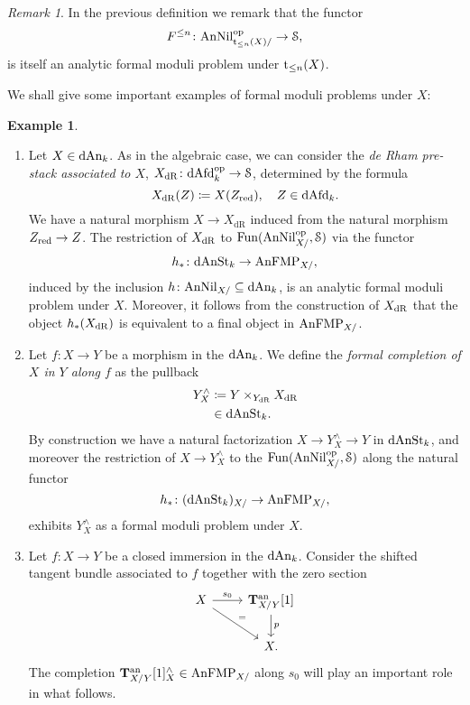 \documentclass[10pt,a4paper,reqno]{amsart} %
\theoremstyle{plain}
\theoremstyle{definition}
\newtheorem{eg}[thm]{Example}
\theoremstyle{remark}
\newtheorem{rem}[thm]{Remark}
\numberwithin{equation}{section}
\begin{document}
\begin{rem}
    In the previous definition we remark that the functor
        \[
            F^{\le n} \colon \mathrm{AnNil}^\mathrm{op}_{\mathrm t_{\le n}(X)/ } \to \mathcal S,  
        \]
    is itself an analytic formal moduli problem under $\mathrm t_{\le n}(X)$.
\end{rem}

We shall give some important examples of formal moduli problems under $X$:

\begin{eg}
    \begin{enumerate}
        \item Let $X \in \mathrm{dAn}_k$. As in the algebraic case, we can consider the \emph{de Rham pre-stack associated to $X$}, $X_\mathrm{dR} \colon \mathrm{dAfd}_k^\mathrm{op} \to \mathcal S$,
        determined by the formula
            \[
                X_{\mathrm{dR}}(Z) \coloneqq X(Z_{\mathrm{red}}), \quad Z \in \mathrm{dAfd}_k.  
            \]
        We have a natural morphism $X \to X_\mathrm{dR}$ induced from the natural morphism $Z_{\mathrm{red}} \to Z$.
        The restriction of $X_{\mathrm{dR}}$ to $\operatorname{Fun}(\mathrm{AnNil}^\mathrm{op}_{X/ }, \mathcal S)$ via the functor
            \[
                h_* \colon \mathrm{dAnSt}_k \to \mathrm{AnFMP}_{X/ },
            \]
        induced by the inclusion $h \colon \mathrm{AnNil}_{X/ } \subseteq \mathrm{dAn}_k$, is an analytic formal moduli problem under $X$.
        Moreover, it follows from the construction of $X_{\mathrm{dR}}$ that the object $h_* (X_{\mathrm{dR}})$ is equivalent to a final object in $\mathrm{AnFMP}_{X/ }$.
        \item Let $f \colon X \to Y$ be a morphism in the \infcat $\mathrm{dAn}_k$. We define the \emph{formal completion of $X$ in $Y$ along $f$} as the pullback 
            \begin{align*}
                Y^\wedge_X  & \coloneqq Y \times_{Y_\mathrm{dR}} X_\mathrm{dR} \\
                            & \in \mathrm{dAnSt}_k.
            \end{align*}
        By construction we have a natural factorization $X \to Y^\wedge_X \to Y$ in $\mathrm{dAnSt}_k$, and moreover the restriction of $X \to Y^\wedge_X$ to the \infcat
        $\operatorname{Fun}(\mathrm{AnNil}^\mathrm{op}_{X/}, \mathcal S)$ along the natural functor
            \[
                h_* \colon  (\mathrm{dAnSt}_k)_{X/ } \to \mathrm{AnFMP}_{X/ },  
            \]
        exhibits $Y^\wedge_X$ as a formal moduli problem under $X$.
        \item Let $f \colon X \to Y$ be a closed immersion in the \infcat $\mathrm{dAn}_k$. Consider the shifted tangent bundle associated to $f$ together with the zero section
            \[
            \begin{tikzcd}
                X \ar{r}{s_0} \ar{rd}{=} & \bT\an_{X/ Y}[1] \ar{d}{p} \\
                    & X.
            \end{tikzcd}
            \]
        The completion $\mathbf T^\mathrm{an}_{X/Y} [1]^\wedge_X \in \mathrm{AnFMP}_{X/ }$ along $s_0$ will play an important role in what follows.
    \end{enumerate}
\end{eg}
\end{document}
